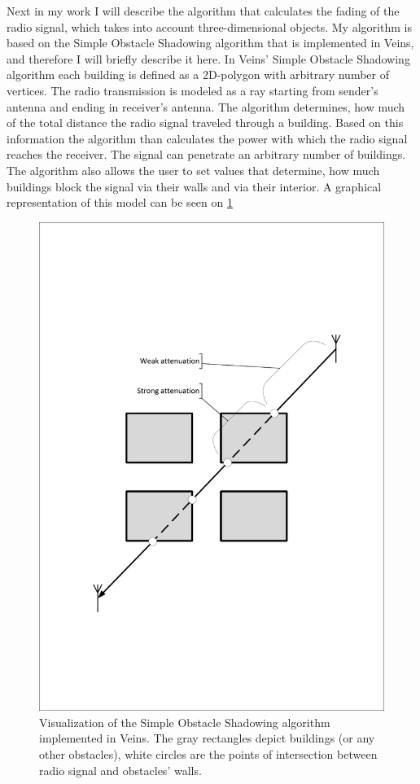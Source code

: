 \documentclass[]{nsm-thesis}
\begin{document}
Next in my work I will describe the algorithm that calculates the fading of the radio signal, which takes into account three-dimensional objects. My algorithm is based on the Simple Obstacle Shadowing algorithm \cite{SimpleObstacleShadowing} that is implemented in Veins, and therefore I will briefly describe it here. In Veins' Simple Obstacle Shadowing algorithm each building is defined as a 2D-polygon with arbitrary number of vertices. The radio transmission is modeled as a ray starting from sender's antenna and ending in receiver's antenna. The algorithm determines, how much of the total distance the radio signal traveled through a building. Based on this information the algorithm than calculates the power with which the radio signal reaches the receiver. The signal can penetrate an arbitrary number of buildings. The algorithm also allows the user to set values that determine, how much buildings block the signal via their walls and via their interior. A graphical representation of this model can be seen on \cref{fig:SimpleObstacleShadowing}

\begin{figure}
	\centering
	\includegraphics[width=1\textwidth]{figures/SimpleObstacleShadowing.pdf}
	\caption{Visualization of the Simple Obstacle Shadowing algorithm implemented in Veins. The gray rectangles depict buildings (or any other obstacles), white circles are the points of intersection between radio signal and obstacles' walls.}
	\label{fig:SimpleObstacleShadowing}
\end{figure}
\end{document}
